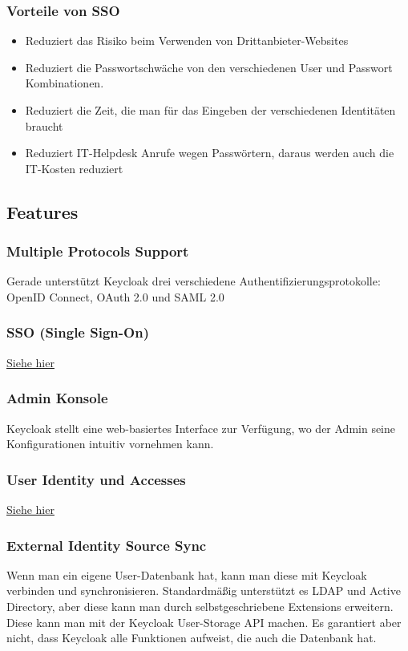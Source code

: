\subsubsection{Vorteile von SSO}
\begin{itemize}
    \item Reduziert das Risiko beim Verwenden von Drittanbieter-Websites
    \item Reduziert die Passwortschwäche von den verschiedenen User und Passwort Kombinationen.
    \item Reduziert die Zeit, die man für das Eingeben der verschiedenen Identitäten braucht
    \item Reduziert IT-Helpdesk Anrufe wegen Passwörtern, daraus werden auch die IT-Kosten reduziert \cite{KeycloakMakeIT}
\end{itemize}

\subsection{Features}
\subsubsection{Multiple Protocols Support}
Gerade unterstützt Keycloak drei verschiedene Authentifizierungsprotokolle: OpenID Connect, OAuth 2.0 und SAML 2.0 \cite{KeyCloakDZone}
\subsubsection{SSO (Single Sign-On)}
\hyperref[sec:SSO]{Siehe hier}
\subsubsection{Admin Konsole}
Keycloak stellt eine web-basiertes Interface zur Verfügung, wo der Admin seine Konfigurationen intuitiv vornehmen kann. \cite{KeyCloakDZone}
\subsubsection{User Identity und Accesses}
\hyperref[sec:IAM]{Siehe hier}
\subsubsection{External Identity Source Sync}
Wenn man ein eigene User-Datenbank  hat, kann man diese mit Keycloak verbinden und synchronisieren. Standardmäßig unterstützt es LDAP und Active Directory, aber diese
kann man durch selbstgeschriebene Extensions erweitern. Diese kann man mit der Keycloak User-Storage API machen. Es garantiert aber nicht, dass Keycloak alle Funktionen aufweist,
die auch die Datenbank hat. \cite{KeyCloakDZone}
